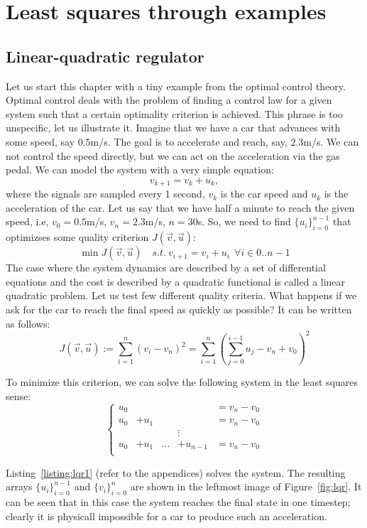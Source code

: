 \documentclass[notitlepage,oneside]{book}
\begin{document}
\chapter{Least squares through examples}

\section{Linear-quadratic regulator}
\label{sec:lqr}
Let us start this chapter with a tiny example from the optimal control theory.
Optimal control deals with the problem of finding a control law for a given system such that a certain optimality criterion is achieved.
This phrase is too unspecific, let us illustrate it.
Imagine that we have a car that advances with some speed, say $0.5$m/s. The goal is to accelerate and reach, say, $2.3$m/s.
We can not control the speed directly, but we can act on the acceleration via the gas pedal.
We can model the system with a very simple equation:
$$
v_{k+1} = v_k + u_k,
$$
where the signals are sampled every 1 second, $v_k$ is the car speed and $u_k$ is the acceleration of the car.
Let us say that we have half a minute to reach the given speed, i.e, $v_0=0.5$m/s, $v_n=2.3$m/s, $n=30$s.
So, we need to find $\{u_i\}_{i=0}^{n-1}$ that optimizses some quality criterion $J(\vec{v}, \vec{u})$:
$$
\min J(\vec{v},\vec{u}) \quad s.t.~  v_{i+1} = v_i + u_i ~~ \forall i \in 0..n-1
$$
The case where the system dynamics are described by a set of differential equations and the cost is described by a quadratic functional is called a linear quadratic problem.
Let us test few different quality criteria. What happens if we ask for the car to reach the final speed as quickly as possible?
It can be written as follows:
$$
J(\vec{v}, \vec{u}) := \sum\limits_{i=1}^n (v_i-v_n)^2 = \sum\limits_{i=1}^n \left(\sum\limits_{j=0}^{i-1}u_j-v_n+v_0\right)^2
$$

To minimize this criterion, we can solve the following system in the least squares sense:
$$
\left \{ \begin{array}{ccccl}
u_0 &       &       &           & = v_n - v_0 \\
u_0 & + u_1 &       &           & = v_n - v_0 \\
    &       &       & \vdots    &             \\
u_0 & + u_1 & \dots & + u_{n-1} & = v_n - v_0 \\
\end{array} \right.
$$

Listing~\ref{listing:lqr1} (refer to the appendices) solves the system.
The resulting arrays $\{u_i\}_{i=0}^{n-1}$ and $\{v_i\}_{i=0}^{n}$ are shown in the leftmost image of Figure~\ref{fig:lqr}.
It can be seen that in this case the system reaches the final state in one timestep; clearly it is physicall impossible for a car to produce such an acceleration.
\end{document}
